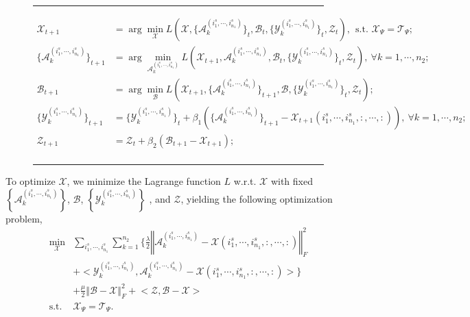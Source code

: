 \documentclass[12pt, draftcls, onecolumn]{IEEEtran}
\theoremstyle{plain}
\theoremstyle{definition}
\theoremstyle{remark}
\begin{document}
\begin{figure}[b]
	\noindent\rule{\textwidth}{1pt}	
	\begin{equation}
	\begin{aligned}
	\label{update_overview}
	\mathcal{X}_{t+1}&=\arg\min_{\mathcal X} L\left({\mathcal{X},\{\mathcal{A}^{(i^s_{1},\cdots,i^s_{n_1})}_k\}_t,\mathcal{B}_t,\{\mathcal{Y}^{(i^s_{1},\cdots,i^s_{n_1})}_k\}_t,\mathcal{Z}_t}\right),\ \ \text{s.t. }\mathcal{X}_\Psi=\mathcal{T}_\Psi;\\
	\{\mathcal{A}^{(i^s_{1},\cdots,i^s_{n_1})}_k\}_{t+1}&=\arg\min_{\mathcal{A}_k^{(i^s_{1},\cdots,i^s_{n_1})}} L\left({\mathcal{X}_{t+1},\mathcal{A}^{(i^s_{1},\cdots,i^s_{n_1})}_k,\mathcal{B}_t,\{\mathcal{Y}^{(i^s_{1},\cdots,i^s_{n_1})}_k\}_t,\mathcal{Z}_t}\right),\ \forall k=1,\cdots,n_2;\\
	\mathcal{B}_{t+1}&=\arg\min_{\mathcal B} L\left({\mathcal{X}_{t+1},\{\mathcal{A}^{(i^s_{1},\cdots,i^s_{n_1})}_k\}_{t+1},\mathcal{B},\{\mathcal{Y}^{(i^s_{1},\cdots,i^s_{n_1})}_k\}_t,\mathcal{Z}_t}\right);\\
	\{\mathcal{Y}^{(i^s_{1},\cdots,i^s_{n_1})}_k\}_{t+1}&=\{\mathcal{Y}^{(i^s_{1},\cdots,i^s_{n_1})}_k\}_{t}+{\beta_1}\left(\{\mathcal{A}^{(i^s_{1},\cdots,i^s_{n_1})}_k\}_{t+1}-\mathcal{X}_{t+1}(i^s_1,\cdots,i^s_{n_1},:,\cdots,:)\right),\ \forall k=1,\cdots,n_2;\\
	\mathcal{Z}_{t+1}&=\mathcal{Z}_{t}+{\beta_2}\left(\mathcal{B}_{t+1}-\mathcal{X}_{t+1}\right);\\
	\end{aligned}
	\end{equation}	
	\noindent\rule{\textwidth}{1pt}
\end{figure}
To optimize $\mathcal X$, we minimize the Lagrange function ${L}$ w.r.t. $\mathcal{X}$ with fixed $\left\{\mathcal{A}^{(i^s_{1},\cdots,i^s_{n_1})}_k\right\}$, $\mathcal{B}$, $\left\{\mathcal{Y}^{(i^s_{1},\cdots,i^s_{n_1})}_k\right\}$ , and $\mathcal{Z}$, yielding the following optimization problem,
\begin{equation}
\label{update_X_no_noise}
\begin{aligned}
\min_{\mathcal{X}}
&\sum_{i^s_{1},\cdots,i^s_{n_1}}\sum_{k=1}^{n_2}\Bigg\{\frac{\lambda}{2}\left\Vert\mathcal{A}^{(i^s_{1},\cdots,i^s_{n_1})}_k-\mathcal{X}(i^s_{1},\cdots,i^s_{n_1},:,\cdots,:)\right\Vert_F^2\\
   &+\bigg<\mathcal{Y}^{(i^s_{1},\cdots,i^s_{n_1})}_k,\mathcal{A}^{(i^s_{1},\cdots,i^s_{n_1})}_k-\mathcal{X}(i^s_{1},\cdots,i^s_{n_1},:,\cdots,:)\bigg>\Bigg\}\\
&+\frac{\mu}{2}\left\Vert\mathcal{B}-\mathcal{X}\right\Vert_F^2+\big<\mathcal{Z},\mathcal{B}-\mathcal{X}\big>\\
\text{s.t.}\ & \mathcal{X}_\Psi = \mathcal{T}_\Psi.\\
\end{aligned}
\end{equation}
\end{document}

